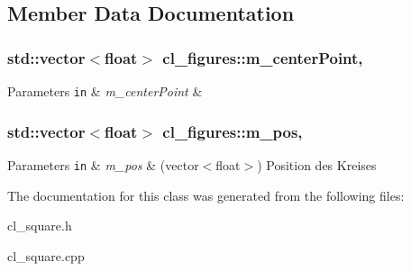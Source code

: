 \subsection{Member Data Documentation}
\hypertarget{classcl__figures_a8db478de16f1fa9005f66c821f1c9231}{}
\subsubsection[{m\+\_\+center\+Point}]{\setlength{\rightskip}{0pt plus 5cm}std\+::vector$<$float$>$ cl\+\_\+figures\+::m\+\_\+center\+Point\hspace{0.3cm}{\ttfamily [protected]}, {\ttfamily [inherited]}}\label{classcl__figures_a8db478de16f1fa9005f66c821f1c9231}

\begin{DoxyParams}[1]{Parameters}
\mbox{\tt in}  & {\em m\+\_\+center\+Point} & \\
\hline
\end{DoxyParams}
\hypertarget{classcl__figures_a2213b88adc79462eb87457ffb18b17a2}{}
\subsubsection[{m\+\_\+pos}]{\setlength{\rightskip}{0pt plus 5cm}std\+::vector$<$float$>$ cl\+\_\+figures\+::m\+\_\+pos\hspace{0.3cm}{\ttfamily [protected]}, {\ttfamily [inherited]}}\label{classcl__figures_a2213b88adc79462eb87457ffb18b17a2}

\begin{DoxyParams}[1]{Parameters}
\mbox{\tt in}  & {\em m\+\_\+pos} & (vector$<$float$>$) Position des Kreises \\
\hline
\end{DoxyParams}


The documentation for this class was generated from the following files\+:\begin{DoxyCompactItemize}
\item 
cl\+\_\+square.\+h\item 
cl\+\_\+square.\+cpp\end{DoxyCompactItemize}
